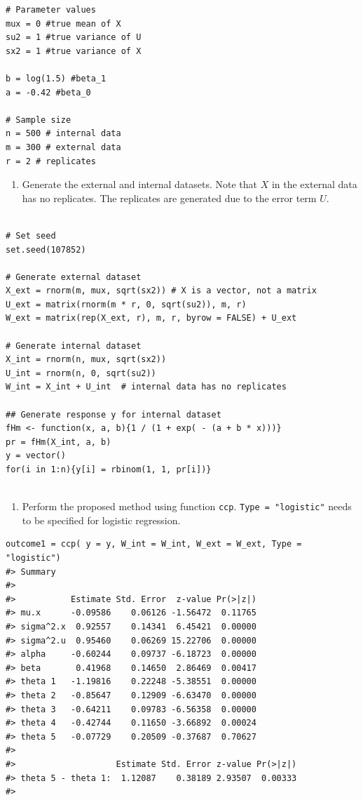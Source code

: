 \documentclass[15 pt,]{article}
\providecommand{\tightlist}{%
  \setlength{\itemsep}{0pt}\setlength{\parskip}{0pt}}
\begin{document}
\begin{verbatim}
# Parameter values
mux = 0 #true mean of X
su2 = 1 #true variance of U
sx2 = 1 #true variance of X

b = log(1.5) #beta_1
a = -0.42 #beta_0

# Sample size
n = 500 # internal data
m = 300 # external data
r = 2 # replicates 
\end{verbatim}

\begin{enumerate}
\def\labelenumi{(\arabic{enumi})}
\setcounter{enumi}{2}
\tightlist
\item
  Generate the external and internal datasets. Note that \(X\) in the
  external data has no replicates. The replicates are generated due to
  the error term \(U\).
\end{enumerate}

\begin{verbatim}

# Set seed
set.seed(107852)

# Generate external dataset
X_ext = rnorm(m, mux, sqrt(sx2)) # X is a vector, not a matrix
U_ext = matrix(rnorm(m * r, 0, sqrt(su2)), m, r)
W_ext = matrix(rep(X_ext, r), m, r, byrow = FALSE) + U_ext 
  
# Generate internal dataset
X_int = rnorm(n, mux, sqrt(sx2))
U_int = rnorm(n, 0, sqrt(su2))
W_int = X_int + U_int  # internal data has no replicates

## Generate response y for internal dataset
fHm <- function(x, a, b){1 / (1 + exp( - (a + b * x)))}
pr = fHm(X_int, a, b)
y = vector()
for(i in 1:n){y[i] = rbinom(1, 1, pr[i])}
  
\end{verbatim}

\begin{enumerate}
\def\labelenumi{(\arabic{enumi})}
\setcounter{enumi}{3}
\tightlist
\item
  Perform the proposed method using function \texttt{ccp}.
  \texttt{Type\ =\ "logistic"} needs to be specified for logistic
  regression.
\end{enumerate}

\begin{verbatim}
outcome1 = ccp( y = y, W_int = W_int, W_ext = W_ext, Type = "logistic")
#> Summary 
#>   
#>           Estimate Std. Error  z-value Pr(>|z|)
#> mu.x      -0.09586    0.06126 -1.56472  0.11765
#> sigma^2.x  0.92557    0.14341  6.45421  0.00000
#> sigma^2.u  0.95460    0.06269 15.22706  0.00000
#> alpha     -0.60244    0.09737 -6.18723  0.00000
#> beta       0.41968    0.14650  2.86469  0.00417
#> theta 1   -1.19816    0.22248 -5.38551  0.00000
#> theta 2   -0.85647    0.12909 -6.63470  0.00000
#> theta 3   -0.64211    0.09783 -6.56358  0.00000
#> theta 4   -0.42744    0.11650 -3.66892  0.00024
#> theta 5   -0.07729    0.20509 -0.37687  0.70627
#>   
#>                    Estimate Std. Error z-value Pr(>|z|)
#> theta 5 - theta 1:  1.12087    0.38189 2.93507  0.00333
#> 
\end{verbatim}
\end{document}

